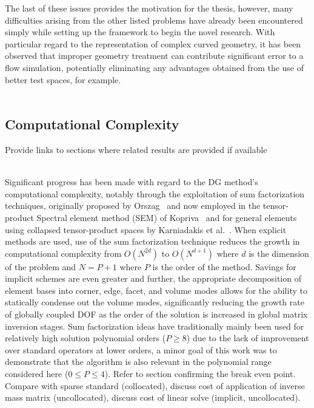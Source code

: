 \documentclass[12pt,Bold,letterpaper,TexShade]{mcgilletdclass}
\numberwithin{equation}{section}
\begin{document}
The last of these issues provides the motivation for the thesis, however, many difficulties arising from the other listed problems have already been encountered simply while setting up the framework to begin the novel research. With particular regard to the representation of complex curved geometry, it has been observed that improper geometry treatment can contribute significant error to a flow simulation, potentially eliminating any advantages obtained from the use of better test spaces, for example.
\\~

\subsection{Computational Complexity}
\label{sec:Comp_comp}
{\color{red} Provide links to sections where related results are provided if available}
\\~

Significant progress has been made with regard to the DG method's computational complexity, notably through the exploitation of sum factorization techniques, originally proposed by Orszag~\cite{orszag1980} and now employed in the tensor-product Spectral element method (SEM) of Kopriva~\cite{kopriva2009} and for general elements using collapsed tensor-product spaces by Karniadakis et al.~\cite{karniadakis1999}. When explicit methods are used, use of the sum factorization technique reduces the growth in computational complexity from $O(N^{2d})$ to $O(N^{d+1})$ where $d$ is the dimension of the problem and $N = P+1$ where $P$ is the order of the method. Savings for implicit schemes are even greater and further, the appropriate decomposition of element bases into corner, edge, facet, and volume modes allows for the ability to statically condense out the volume modes, significantly reducing the growth rate of globally coupled DOF as the order of the solution is increased in global matrix inversion stages. Sum factorization ideas have traditionally mainly been used for relatively high solution polynomial orders ($P \geq 8$) due to the lack of improvement over standard operators at lower orders, a minor goal of this work was to demonstrate that the algorithm is also relevant in the polynomial range considered here ($0 \leq P \leq 4$). {\color{red} Refer to section confirming the break even point. Compare with sparse standard (collocated), discuss cost of application of inverse mass matrix (uncollocated), discuss cost of linear solve (implicit, uncollocated).}
\\~
\end{document}
